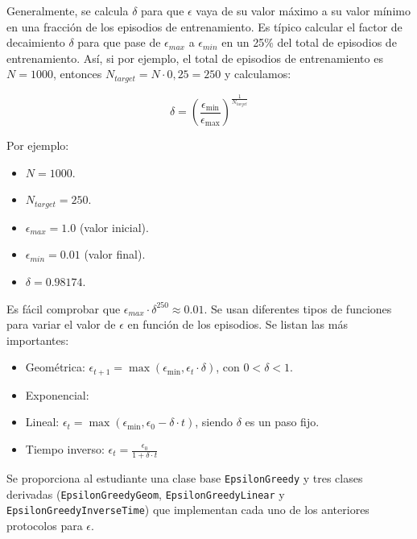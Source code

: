 \documentclass{article}
\begin{document}
Generalmente, se calcula $\delta$ para que $\epsilon$ vaya de su valor máximo a su valor mínimo en una fracción de los episodios de entrenamiento. Es típico calcular el factor de decaimiento $\delta$ para que pase de $\epsilon_{max}$ a $\epsilon_{min}$ en un 25\% del total de episodios de entrenamiento. Así, si por ejemplo, el total de episodios de entrenamiento es $N=1000$, entonces $N_{target}=N\cdot 0,25=250$ y calculamos:

$$\delta = \left(\frac{\epsilon_{\text{min}}}{\epsilon_{\text{max}}} \right)^{\frac{1}{N_{target}}}$$

Por ejemplo:
\begin{itemize}
    \item $N=1000$.
    \item $N_{target}=250$.
    \item $\epsilon_{max}=1.0$ (valor inicial).
    \item $\epsilon_{min}=0.01$ (valor final).
    \item $\delta=0.98174$.
\end{itemize}
Es fácil comprobar que $\epsilon_{max}\cdot \delta^{250}\approx 0.01$. Se usan diferentes tipos de funciones para variar el valor de $\epsilon$ en función de los episodios. Se listan las más importantes:
\begin{itemize}
    \item Geométrica: $\epsilon_{t+1} = \max(\epsilon_{\min}, \epsilon_t \cdot \delta)$, con $0 < \delta < 1$. 
    \item Exponencial: 
    \item Lineal: $\epsilon_t = \max(\epsilon_{\min}, \epsilon_0 - \delta \cdot t)$, siendo $\delta$ es un paso fijo. 
    \item Tiempo inverso: $\epsilon_t = \frac{\epsilon_0}{1 + \delta \cdot t}$ 
\end{itemize}

Se proporciona al estudiante una clase base \texttt{EpsilonGreedy} y tres clases derivadas (\texttt{EpsilonGreedyGeom}, \texttt{EpsilonGreedyLinear} y \texttt{EpsilonGreedyInverseTime}) que implementan cada uno de los anteriores protocolos para $\epsilon$.
\end{document}
